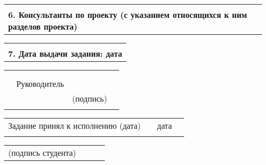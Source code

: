 \documentclass[12pt, А4]{article} %
\begin{document}
\begin{FlushLeft}
    \begin{tabular}{p{17.25cm}} %
        \vspace{1pt} \hline  \\
        \textsf{\textbf{6. Консультанты по проекту (с указанием относящихся к ним разделов проекта)}} \vspace{1pt} \hline \\
    \end{tabular} %

    \begin{tabular}{p{17.25cm}} %
        \vspace{1pt} \hline  \\
        \textsf{\textbf{7. Дата выдачи задания: дата}} \vspace{1pt} \hline \\
    \end{tabular} %

    \begin{tabular}{p{4.2cm} p{3.8cm} p{6.0cm} p{2.0cm}} %
        & & & 
        \\ %
        & & & 
        \\ %
        & \fontsize{14}{17.5} \textrm{Руководитель} & 
        \vspace{1pt} \hline & 
        \\ %
        & & \centering \fontsize{12}{15} \textsf{(подпись)} & 
        \\ %
        & & &
    \end{tabular} %

\fontsize{12}{15}

    \begin{tabular}{p{7.5cm} p{0.5cm} p{6.0cm} p{2.0cm}} %
        \textsf{Задание принял к исполнению (дата)} & &
        \centering \textsf{дата} \vspace{1pt} \hline & 
        \\ %
        & & & %
    \end{tabular} %

    \begin{tabular}{p{4.0cm} p{0.2cm} p{9.8cm} p{2.0cm}} %
        \textsf{(подпись студента)} & &
        \vspace{1pt} \hline & 
        \\ %
    \end{tabular} %

\end{FlushLeft} %
\end{document}
